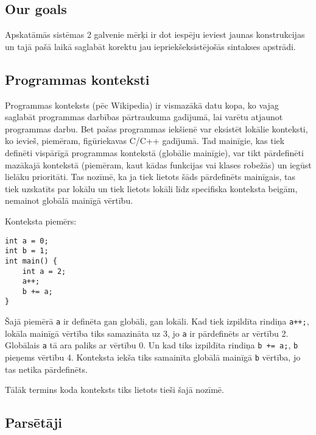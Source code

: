 \documentclass[12pt]{report}
\begin{document}
\subsection{Our goals}
Apskatāmās sistēmas 2 galvenie mērķi ir dot iespēju ieviest jaunas konstrukcijas un tajā pašā laikā saglabāt korektu jau iepriekšeksistējošās sintakses apstrādi.

\subsection{Programmas konteksti}
Programmas konteksts (pēc Wikipedia) ir vismazākā datu kopa, ko vajag saglabāt programmas darbības pārtraukuma gadījumā, lai varētu atjaunot programmas darbu. Bet pašas programmas iekšienē var eksistēt lokālie konteksti, ko ievieš, piemēram, figūriekavas C/C++ gadījumā. Tad mainīgie, kas tiek definēti vispārīgā programmas kontekstā (globālie mainīgie), var tikt pārdefinēti mazākajā kontekstā (piemēram, kaut kādas funkcijas vai klases robežās) un iegūst lielāku prioritāti. Tas nozīmē, ka ja tiek lietots šāds pārdefinēts mainīgais, tas tiek uzskatīts par lokālu un tiek lietots lokāli līdz specifiska konteksta beigām, nemainot globālā mainīgā vērtību.

Konteksta piemērs:
\begin{verbatim}
int a = 0;
int b = 1;
int main() {
    int a = 2;
    a++;
    b += a;
}
\end{verbatim} 
Šajā piemērā \verb|a| ir definēta gan globāli, gan lokāli. Kad tiek izpildīta rindiņa \verb|a++;|, lokāla mainīgā vērtība tiks samazināta uz 3, jo \verb|a| ir pārdefinēts ar vērtību 2. Globālais \verb|a| tā ara paliks ar vērtību 0. Un kad tiks izpildīta rindiņa \verb|b += a;|, \verb|b| pieņems vērtību 4. Konteksta iekša tiks samainīta globālā mainīgā \verb|b| vērtība, jo tas netika pārdefinēts.

Tālāk termins koda konteksts tiks lietots tieši šajā nozīmē. 

\subsection{Parsētāji}
\end{document}
